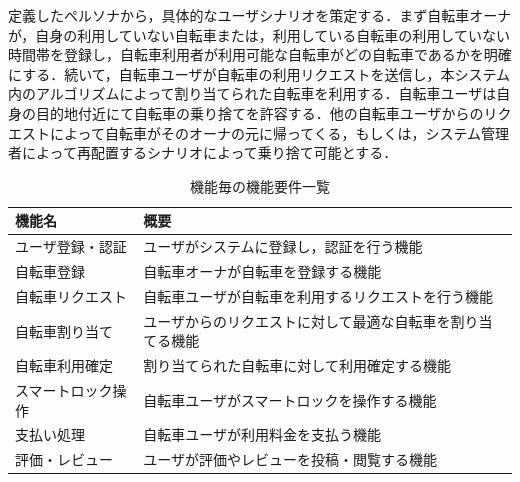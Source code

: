           \par 定義したペルソナから，具体的なユーザシナリオを策定する．まず自転車オーナが，自身の利用していない自転車または，利用している自転車の利用していない時間帯を登録し，自転車利用者が利用可能な自転車がどの自転車であるかを明確にする．続いて，自転車ユーザが自転車の利用リクエストを送信し，本システム内のアルゴリズムによって割り当てられた自転車を利用する．自転車ユーザは自身の目的地付近にて自転車の乗り捨てを許容する．他の自転車ユーザからのリクエストによって自転車がそのオーナの元に帰ってくる，もしくは，システム管理者によって再配置するシナリオによって乗り捨て可能とする．
          
          
      \begin{table}[htbp]
        \caption{機能毎の機能要件一覧}
        \label{tab:機能毎の機能要件一覧}
        \centering
        \begin{tabular}{|l|p{4cm}|} \hline
          機能名 & 概要 \\ \hline
          ユーザ登録・認証 & ユーザがシステムに登録し，認証を行う機能 \\ \hline
          自転車登録 & 自転車オーナが自転車を登録する機能 \\ \hline
          自転車リクエスト & 自転車ユーザが自転車を利用するリクエストを行う機能 \\ \hline
          自転車割り当て & ユーザからのリクエストに対して最適な自転車を割り当てる機能 \\ \hline
          自転車利用確定 & 割り当てられた自転車に対して利用確定する機能 \\ \hline
          スマートロック操作 & 自転車ユーザがスマートロックを操作する機能 \\ \hline
          支払い処理 & 自転車ユーザが利用料金を支払う機能 \\ \hline
          評価・レビュー & ユーザが評価やレビューを投稿・閲覧する機能 \\ \hline
        \end{tabular}
      \end{table}



